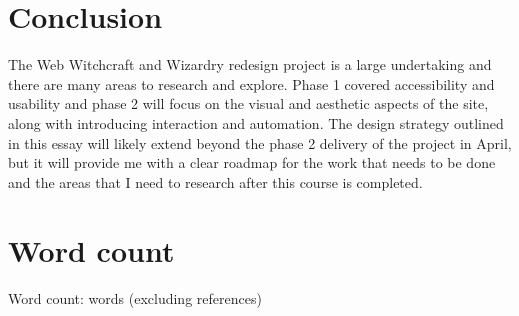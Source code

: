 \documentclass[a4paper, 12pt]{article}
\begin{document}
\section*{Conclusion}
The Web Witchcraft and Wizardry redesign project is a large undertaking and there are many areas to research and explore. Phase 1 covered accessibility and usability and phase 2 will focus on the visual and aesthetic aspects of the site, along with introducing interaction and automation. The design strategy outlined in this essay will likely extend beyond the phase 2 delivery of the project in April, but it will provide me with a clear roadmap for the work that needs to be done and the areas that I need to research after this course is completed.

\section*{Word count}
Word count:  words (excluding references)
\\

\end{document}
